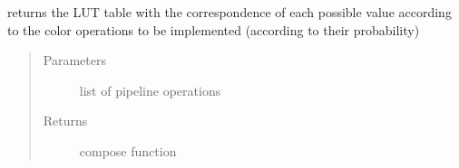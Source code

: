 \documentclass[letterpaper,10pt,english]{sphinxmanual}
\begin{document}
\begin{fulllineitems}
\label{\detokenize{ida_lib.core:ida_lib.core.pipeline_functional.get_compose_function}}
returns the LUT table with the correspondence of each possible value
according to the color operations to be implemented (according to their probability)
\begin{quote}\begin{description}
\item[{Parameters}] \leavevmode
{} \textendash{} list of pipeline operations

\item[{Returns}] \leavevmode
compose function

\end{description}\end{quote}

\end{fulllineitems}

\end{document}
